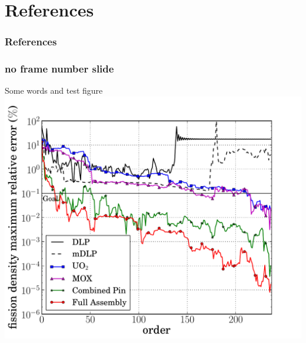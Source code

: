 \documentclass[fleqn]{beamer}
\begin{document}
%             
%             
%             
%         
    
    \section{References}
    
    \begin{frame}[t,allowframebreaks]\label{lastframe}
        \frametitle{References}
        
        
    \end{frame}
    
    \beginbackup %
    
    \begin{frame}[noframenumbering]
        \frametitle{no frame number slide}
        \begin{center}
            Some words and test figure
            \includegraphics[trim=.1cm .25cm 2.0cm .4cm, clip=true, totalheight=.8\textheight]{sample_figure}
        \end{center}
    \end{frame}
    
    \backupend %
    
\end{document}
